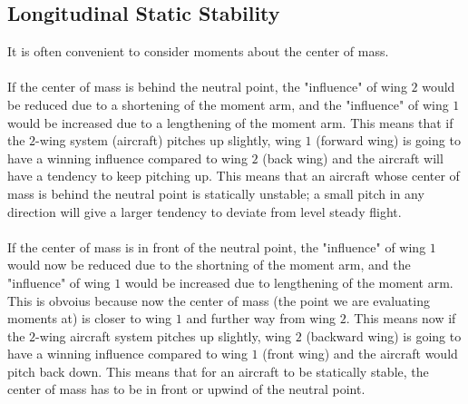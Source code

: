 \subsection{Longitudinal Static Stability}
\begin{comment}
\end{comment}
It is often convenient to consider moments about the center of mass. 
\\~\\If the center of mass is behind the neutral point, the "influence" of wing $2$ would be reduced due to a shortening of the moment arm, and the "influence" of wing $1$ would be increased due to a lengthening of the moment arm. 
This means that if the $2$-wing system (aircraft) pitches up slightly, wing $1$ (forward wing) is going to have a winning influence compared to wing $2$ (back wing) and the aircraft will have a tendency to keep pitching up.
This means that an aircraft whose center of mass is behind the neutral point is statically unstable; a small pitch in any direction will give a larger tendency to deviate from level steady flight.
\\~\\If the center of mass is in front of the neutral point, the "influence" of wing $1$ would now be reduced due to the shortning of the moment arm, and the "influence" of wing $1$ would be increased due to lengthening of the moment arm.
This is obvoius because now the center of mass (the point we are evaluating moments at) is closer to wing $1$ and further way from wing $2$.
This means now if the $2$-wing aircraft system pitches up slightly, wing $2$ (backward wing) is going to have a winning influence compared to wing $1$ (front wing) and the aircraft would pitch back down.
This means that for an aircraft to be statically stable, the center of mass has to be in front or upwind of the neutral point.


